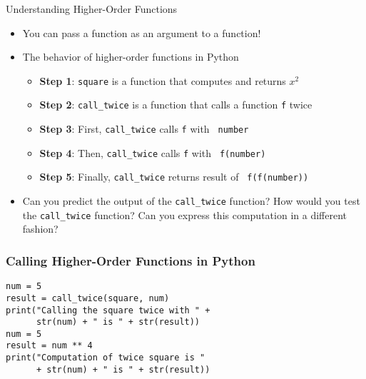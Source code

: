 \documentclass[14pt,aspectratio=169]{beamer}
\begin{document}
%
\begin{frame}{Understanding Higher-Order Functions}
  \begin{itemize}
    \item You can pass a function as an argument to a function!
      \vspace*{-.15in}
    \item The behavior of higher-order functions in Python
      \begin{itemize}
        \item {\bf Step 1}: {\tt square} is a function that computes and
          returns $x^2$
        \item {\bf Step 2}: {\tt call\_twice} is a function that calls a
          function {\tt f} twice
        \item {\bf Step 3}: First, {\tt call\_twice} calls {\tt f} with {\tt
          number}
        \item {\bf Step 4}: Then, {\tt call\_twice} calls {\tt f} with {\tt
          f(number)}
        \item {\bf Step 5}: Finally, {\tt call\_twice} returns result of {\tt
          f(f(number))}
      \end{itemize}
      \vspace*{-.2in}
    \item Can you predict the output of the {\tt call\_twice} function? How
      would you test the {\tt call\_twice} function? Can you express this
      computation in a different fashion?
  \end{itemize}
\end{frame}

%
\begin{frame}[fragile]
  \frametitle{Calling Higher-Order Functions in Python}
  \hspace*{-.1in}
  \begin{minipage}{6in}
    \begin{verbatim}
num = 5
result = call_twice(square, num)
print("Calling the square twice with " +
      str(num) + " is " + str(result))
num = 5
result = num ** 4
print("Computation of twice square is "
      + str(num) + " is " + str(result))
    \end{verbatim}
  \end{minipage}
  \vspace*{.05in}
\end{frame}
\end{document}
